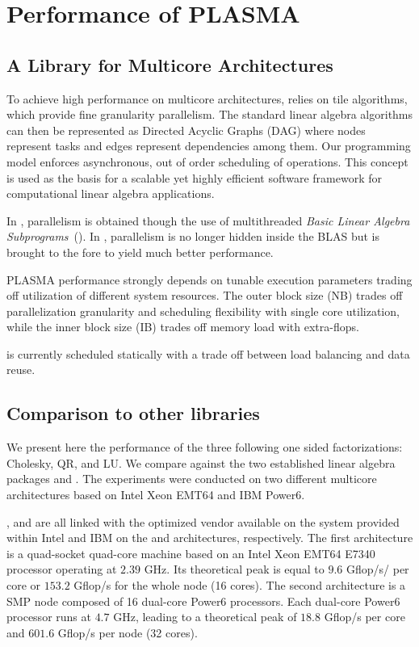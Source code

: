 
\chapter{Performance of PLASMA}

\section{A Library for Multicore Architectures}

To achieve high performance on multicore architectures, \PLASMA
relies on tile algorithms, which provide fine granularity
parallelism. The standard linear algebra algorithms can then be
represented as Directed Acyclic Graphs (DAG) where nodes represent
tasks and edges represent dependencies among them.  Our programming
model enforces asynchronous, out of order scheduling of
operations. This concept is used as the basis for a scalable yet
highly efficient software framework for computational linear algebra
applications.

In \LAPACK, parallelism is obtained though the use of multithreaded
{\em Basic Linear Algebra Subprograms}~(\BLAS). In \PLASMA, parallelism is
no longer hidden inside the BLAS but is brought to the fore to yield
much better performance.

PLASMA performance strongly depends on tunable execution parameters
trading off utilization of different system resources.  The outer
block size (NB) trades off parallelization granularity and scheduling
flexibility with single core utilization, while the inner block size
(IB) trades off memory load with extra-flops.

\PLASMA is currently scheduled statically with a trade off between load
balancing and data reuse.

\section{Comparison to other libraries}
\label{sec:comparison}


We present here the performance of the three following one sided
factorizations: Cholesky, QR, and LU. We compare \PLASMA against
the two established linear algebra packages \LAPACK and \SCALAPACK. The
experiments were conducted on two different multicore architectures
based on Intel Xeon EMT64 and IBM Power6.

\PLASMA, \LAPACK and \SCALAPACK are all linked with the optimized
vendor \BLAS available on the system provided within Intel 
and IBM  on the \Intel and \Power architectures,
respectively. The first architecture is a quad-socket quad-core
machine based on an Intel Xeon EMT64 E7340 processor operating at
$2.39$ GHz. Its theoretical peak is equal to $9.6$ Gflop/s/ per core
or $153.2$ Gflop/s for the whole node (16 cores). The second
architecture is a SMP node composed of 16 dual-core Power6
processors. Each dual-core Power6 processor runs at $4.7$ GHz, leading
to a theoretical peak of $18.8$ Gflop/s per core and $601.6$ Gflop/s
per node (32 cores).

